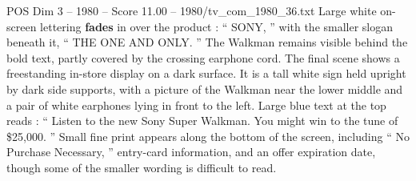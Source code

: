 \begin{textsample}{POS Dim 3 – 1980 – Score 11.00 – 1980/tv\_com\_1980\_36.txt}
Large white on-screen lettering \textbf{fades} in over the product : “ SONY, ” with the smaller slogan beneath it, “ THE ONE AND ONLY. ” The Walkman remains visible behind the bold text, partly covered by the crossing earphone cord.
The final scene shows a freestanding in-store display on a dark surface.
It is a tall white sign held upright by dark side supports, with a picture of the Walkman near the lower middle and a pair of white earphones lying in front to the left.
Large blue text at the top reads : “ Listen to the new Sony Super Walkman.
You might win to the tune of \$25,000. ” Small fine print appears along the bottom of the screen, including “ No Purchase Necessary, ” entry-card information, and an offer expiration date, though some of the smaller wording is difficult to read.

\end{textsample}
